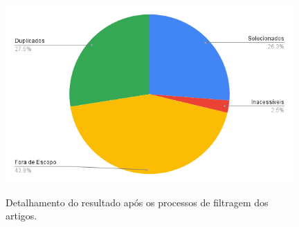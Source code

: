 \begin{enumerate}
    \begin{figure}[H]
    \centering
    \caption{Detalhamento do resultado após os processos de filtragem dos artigos.} \includegraphics[width=11cm,height=\textwidth,keepaspectratio]{2-images/chart-2.png}
    \newline {}\label{fig:grafico_processamento_papers}
    \end{figure}    


\end{enumerate}
